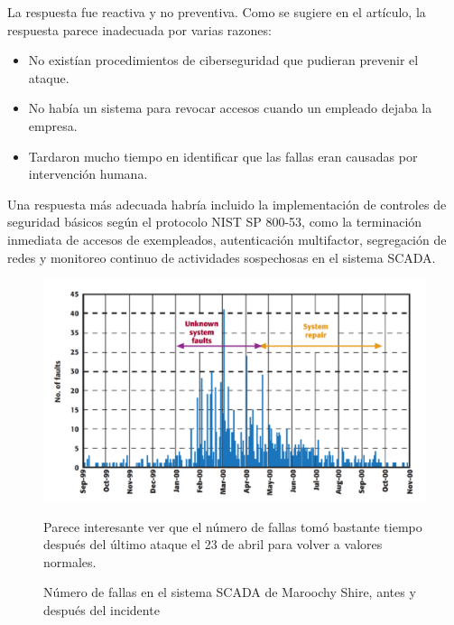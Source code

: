 \begin{paracol}{2}
    \colfill
    
    La respuesta fue reactiva y no preventiva. Como se sugiere en el artículo, la respuesta parece inadecuada por varias razones:
    
    \begin{itemize}
        \item No existían procedimientos de ciberseguridad que pudieran prevenir el ataque.
        \item No había un sistema para revocar accesos cuando un empleado dejaba la empresa.
        \item Tardaron mucho tiempo en identificar que las fallas eran causadas por intervención humana.
    \end{itemize}
    
    Una respuesta más adecuada habría incluido la implementación de controles de seguridad básicos según el protocolo NIST SP 800-53, como la terminación inmediata de accesos de exempleados, autenticación multifactor, segregación de redes y monitoreo continuo de actividades sospechosas en el sistema SCADA.
    \colfill

    \switchcolumn

    \begin{figure}[htbp]
        \centering
            \includegraphics[width=1\columnwidth]{images/maroochyFaults.png}
            \caption{Número de fallas en el sistema SCADA de Maroochy Shire, antes y después del incidente}
            \label{fig:maroochyFaults}

            Parece interesante ver que el número de fallas tomó bastante tiempo después del último ataque el 23 de abril para volver a valores normales.
    \end{figure}

\end{paracol}



